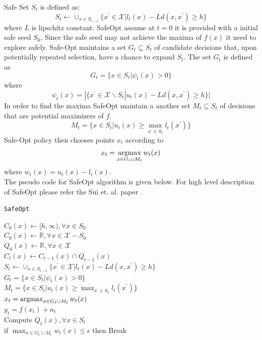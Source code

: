 Safe Set $S_t$ is defined as:
$$ S_t \gets \cup_{x\in S_{t-1}}\{ x^\prime \in \mathcal{X} | l_t(x) - Ld(x,x^\prime) \geq h \} $$
where $L$ is lipschitz constant. 
SafeOpt assume at $t = 0$ it is provided with a initial safe seed $S_0$. 
Since the safe seed may not achieve the maxima of $f(x)$ it need to explore safely.
Safe-Opt maintains a set $G_t \subseteq S_t$ of candidate decisions that, upon potentially repeated selection, have a chance to expand $S_t$. The set $G_t$ is defined as
$$ G_t = \{x \in S_t | \psi_t(x) > 0 \} $$
where
$$ \psi_t(x) = |\{ x^\prime \in \mathcal{X} \backslash S_t | u_t(x) - Ld(x,x^\prime) \geq h \}| $$
In order to find the maxima SafeOpt maintain a another set $M_t \subseteq S_t$ of decisions that are potential maximizers of $f$.
$$ M_t = \{ x \in S_t |u_t(x) \geq \max_{x^\prime \in S_t} l_t(x^\prime) \} $$
Safe-Opt policy then chooses points $x_t$ according to $$ x_t = \operatorname*{argmax}_{x\in G_t \cup M_t}w_t(x) $$
where $w_t(x)=u_t(x)-l_t(x)$.\\
The pseudo code for SafeOpt algorithm is given below. For high level description of SafeOpt please refer the Sui et. al. paper \cite{sui15}.
\begin{algorithm}
	\caption{\texttt{SafeOpt}}
	\label{alg:safeopt}
	$C_0(x) \gets [h, \infty), \forall x \in S_0$\\
	$C_0(x) \gets \mathbb{R}, \forall x \in \mathcal{X} - S_0$\\
	$Q_0(x) \gets \mathbb{R}, \forall x \in \mathcal{X}$\\
	{
		$C_t(x) \gets C_{t-1}(x) \cap Q_{t-1}(x)$\\
		$S_t \gets \cup_{x\in S_{t-1}}\{ x^\prime \in \mathcal{X} | l_t(x) - Ld(x,x^\prime) \geq h \}$\\
		$G_t = \{x \in S_t | \psi_t(x) > 0 \}$\\
		$M_t = \{ x \in S_t |u_t(x) \geq \max_{x^\prime \in S_t} l_t(x^\prime) \}$\\
		$x_t = \operatorname*{argmax}_{x\in G_t \cup M_t}w_t(x)$\\
		$y_t = f(x_t)+n_t$\\
		Compute $Q_t(x), \forall x \in S_t$\\
		if $\max_{ x\in G_t \cup M_t}w_t(x) \leq \epsilon$ then Break
	}
\end{algorithm}

